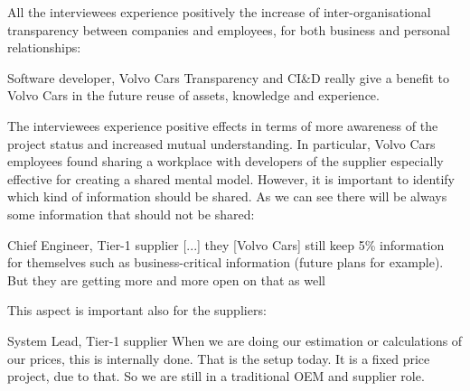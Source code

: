  All the interviewees experience positively the increase of inter-organisational transparency between companies and employees, for both business and personal relationships: 

\begin{aquote}{Software developer, Volvo Cars}
Transparency and CI\&D really give a benefit to Volvo Cars in the future reuse of assets, knowledge and experience.
\end{aquote}


The interviewees experience positive effects in terms of more awareness of the project status and increased mutual understanding. In particular, Volvo Cars employees found sharing a workplace with developers of the supplier especially effective for creating a shared mental model.  %
However, it is important to identify which kind of information should be shared. 
As we can see there will be always some information that should not be shared:

\begin{aquote}{Chief Engineer, Tier-1 supplier}
[...] they [Volvo Cars] still keep 5\% information for themselves such as business-critical information (future plans for example). But they are getting more and more open on that as well
\end{aquote}

This aspect is important also for the suppliers:

\begin{aquote}{System Lead, Tier-1 supplier}
When we are doing our estimation or calculations of our prices, this is internally done. That is the setup today. It is a fixed price project, due to that. So we are still in a traditional OEM and supplier role.
\end{aquote}


